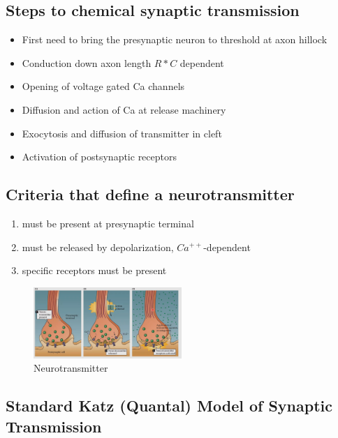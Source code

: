 \documentclass{article}
\begin{document}
\subsection{Steps to chemical synaptic transmission}

\begin{itemize}
    \item First need to bring the presynaptic neuron to threshold at axon hillock
    \item Conduction down axon length $R * C$ dependent
    \item Opening of voltage gated Ca channels
    \item Diffusion and action of Ca at release machinery
    \item Exocytosis and diffusion of transmitter in cleft
    \item Activation of postsynaptic receptors
\end{itemize}

\subsection{Criteria that define a neurotransmitter}

\begin{enumerate}
    \item must be present at presynaptic terminal
    \item must be released by depolarization, $Ca^{++}$-dependent
    \item specific receptors must be present
\end{enumerate}

\begin{figure}[H]
\centering
\includegraphics[width=0.5\textwidth]{assets/neurotransmitter.png}
\caption{Neurotransmitter}
\end{figure}

\subsection{Standard Katz (Quantal) Model of Synaptic Transmission}
\end{document}
